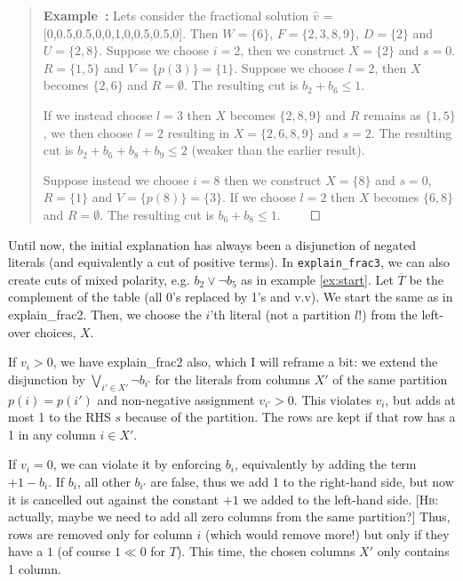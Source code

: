 \documentclass{article}
\newcounter{excount}
\newenvironment{example}{\begin{quote}\refstepcounter{excount}\textbf{Example~\arabic{excount}:}}{\hfill$\qed$\end{quote}}
\newcommand{\hb}[1]{\colorPars{red}{{\textsc{Hb:} #1}}}
\newcommand{\colorPars}[2]{{\leavevmode\color{#1}[#2]}}
\begin{document}
\begin{example}
\label{ex:explain-frac}
    Lets consider the fractional solution 
    $\hat{v}$ = [0,0.5,0.5,0,0,1,0,0.5,0.5,0].
    Then $W = \{6\}$, $F = \{2,3,8,9\}$,
    $D = \{ 2 \}$ and $U = \{2,8\}$.
    Suppose we choose $i = 2$, then we 
    construct $X = \{2\}$ and $s = 0$.
    $R = \{ 1,5 \}$ and $V = \{p(3)\} = \{1\}$. 
    Suppose we choose $l = 2$, then $X$ becomes $\{2,6\}$
    and $R = \emptyset$. The resulting cut is
    $b_2 + b_6 \leq 1$.

    If we instead choose $l = 3$ then $X$ becomes $\{2,8,9\}$
    and $R$ remains as $\{1,5\}$, we then choose $l = 2$
    resulting in $X = \{2,6,8,9\}$ and $s = 2$. The resulting cut is $b_2 + b_6 + b_8 + b_9 \leq 2$ (weaker than the earlier result).

    Suppose instead we choose $i = 8$ then we construct
    $X = \{8\}$ and $s = 0$, $R = \{1\}$ and $V = \{p(8)\} = \{3\}$. If we choose $l = 2$ then $X$ becomes $\{6,8\}$ and
    $R = \emptyset$. The resulting cut is $b_6 + b_8 \leq 1$.
\end{example}

Until now, the initial explanation has always been a disjunction of negated literals (and equivalently a cut of positive terms).
In \texttt{explain\_frac3}, we can also create cuts of mixed polarity, e.g. $b_2 \lor \neg b_5$ as in example \ref{ex:start}.
Let $\overline{T}$ be the complement of the table (all 0's replaced by 1's and v.v).
We start the same as in explain\_frac2.
Then, we choose the $i$'th literal (not a partition $l$!) from the left-over choices, $X$.

If $v_i>0$, we have explain\_frac2 also, which I will reframe a bit:
we extend the disjunction by $\bigvee_{i' \in X'} \neg b_{i'}$ for the literals from columns $X'$ of the same partition $p(i) = p(i')$ and non-negative assignment $v_{i'} > 0$.
This violates $v_i$, but adds at most 1 to the RHS $s$ because of the partition.
The rows are kept if that row has a 1 in any column $i \in X'$.

If $v_i = 0$, we can violate it by enforcing $b_i$, equivalently by adding the term $+1-b_i$.
If $b_i$, all other $b_{i'}$ are false, thus we add 1 to the right-hand side, but now it is cancelled out against the constant $+1$ we added to the left-hand side.
\hb{actually, maybe we need to add all zero columns from the same partition?}
Thus, rows are removed only for column $i$ (which would remove more!) but only if they have a $1$ (of course $1 \ll 0$ for $T$).
This time, the chosen columns $X'$ only contains 1 column.
\end{document}
